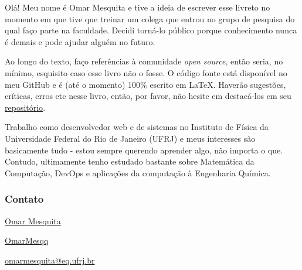 \documentclass{article}
\begin{document}
  Olá! Meu nome é Omar Mesquita e tive a ideia de escrever esse livreto no momento em que tive que treinar um colega que entrou 
  no grupo de pesquisa do qual faço parte na faculdade. Decidi torná-lo público porque conhecimento nunca é demais 
  e pode ajudar alguém no futuro. 

  Ao longo do texto, faço referências à comunidade \textit{open source}, então seria, no mínimo, esquisito caso esse livro não o fosse.
  O código fonte está disponível no meu GitHub e é (até o momento) 100\% escrito em \LaTeX. Haverão sugestões, críticas, erros etc nesse livro, então, por favor, não hesite em destacá-los em seu \href{https://github.com/OmarMesqq/livro}{repositório}. 

  
  Trabalho como desenvolvedor web e de sistemas no Instituto de Física da Universidade Federal do Rio de Janeiro (UFRJ) e meus 
  interesses são basicamente tudo - estou sempre querendo aprender algo, não importa o que. Contudo, ultimamente tenho estudado 
  bastante sobre Matemática da Computação, DevOps e aplicações da computação à Engenharia Química.

  \subsubsection{Contato}

   \hspace{1ex} \href{https://www.linkedin.com/in/omar-mesquita/}{Omar Mesquita}


  	\hspace{1ex} \href{https://github.com/OmarMesqq}{OmarMesqq}
  
 
   \hspace{1ex} \href{mailto:omarmesquita@eq.ufrj.br}{omarmesquita@eq.ufrj.br}
  
\end{document}
